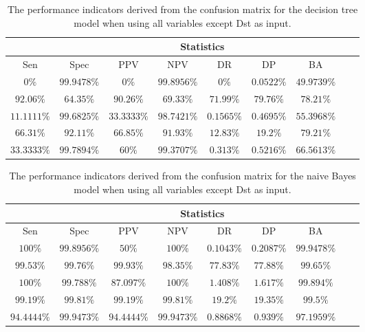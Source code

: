 \begin{table}[!ht]
	\centering
	\begin{tabular}{|c|c|c|c|c|c|c|c|c|}
		\hline
		 & \multicolumn{7}{c|}{Statistics} \\ \hline
		Sen & Spec & PPV & NPV & DR & DP & BA \\ \hline
		$0\%$ & $99.9478\%$ & $0\%$ & $99.8956\%$ & $0\%$ & $0.0522\%$ & $49.9739\%$ \\ \hline
		$92.06\%$ & $64.35\%$ & $90.26\%$ & $69.33\%$ & $71.99\%$ & $79.76\%$ & $78.21\%$ \\ \hline
		$11.1111\%$ & $99.6825\%$ & $33.3333\%$ & $98.7421\%$ & $0.1565\%$ & $0.4695\%$ & $55.3968\%$ \\ \hline
		$66.31\%$ & $92.11\%$ & $66.85\%$ & $91.93\%$ & $12.83\%$ & $19.2\%$ & $79.21\%$ \\ \hline
		$33.3333\%$ & $99.7894\%$ & $60\%$ & $99.3707\%$ & $0.313\%$ & $0.5216\%$ & $66.5613\%$ \\ \hline
	\end{tabular}
	\caption{The performance indicators derived from the confusion matrix for the decision tree model when using all variables except Dst as input.}
	\label{tab:cs:noDst:C5.0}
\end{table}

\begin{table}[!ht]
	\centering
	\begin{tabular}{|c|c|c|c|c|c|c|c|c|}
		\hline
		 & \multicolumn{7}{c|}{Statistics} \\ \hline
		Sen & Spec & PPV & NPV & DR & DP & BA \\ \hline
		$100\%$ & $99.8956\%$ & $50\%$ & $100\%$ & $0.1043\%$ & $0.2087\%$ & $99.9478\%$ \\ \hline
		$99.53\%$ & $99.76\%$ & $99.93\%$ & $98.35\%$ & $77.83\%$ & $77.88\%$ & $99.65\%$ \\ \hline
		$100\%$ & $99.788\%$ & $87.097\%$ & $100\%$ & $1.408\%$ & $1.617\%$ & $99.894\%$ \\ \hline
		$99.19\%$ & $99.81\%$ & $99.19\%$ & $99.81\%$ & $19.2\%$ & $19.35\%$ & $99.5\%$ \\ \hline
		$94.4444\%$ & $99.9473\%$ & $94.4444\%$ & $99.9473\%$ & $0.8868\%$ & $0.939\%$ & $97.1959\%$ \\ \hline
	\end{tabular}
	\caption{The performance indicators derived from the confusion matrix for the naive Bayes model when using all variables except Dst as input.}
	\label{tab:cs:noDst:nb}
\end{table}

